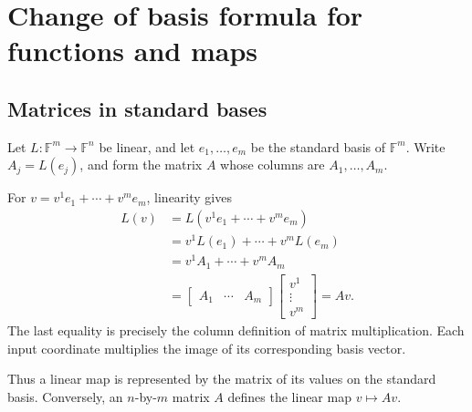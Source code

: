 \section{Change of basis formula for functions and maps}
\label{sec:linear-algebra-i:change-of-basis-for-functions-and-maps}

\subsection{Matrices in standard bases}

Let \(L:\mathbb F^m\to\mathbb F^n\) be linear, and let
\(e_1,\ldots,e_m\) be the standard basis of \(\mathbb F^m\).
Write \(A_j=L(e_j)\), and form the matrix \(A\) whose columns are
\(A_1,\ldots,A_m\).
\begin{pendingreview}
For \(v=v^1e_1+\cdots+v^me_m\), linearity gives
\[
  \begin{aligned}
    L(v)&=L(v^1e_1+\cdots+v^me_m)\\
      &=v^1L(e_1)+\cdots+v^mL(e_m)\\
      &=v^1A_1+\cdots+v^mA_m\\
      &=\begin{bmatrix}A_1&\cdots&A_m\end{bmatrix}
        \begin{bmatrix}v^1\\\vdots\\v^m\end{bmatrix}=Av.
  \end{aligned}
\]
The last equality is precisely the column definition of matrix multiplication.
Each input coordinate multiplies the image of its corresponding basis vector.
\end{pendingreview}
Thus a linear map is represented by the matrix of its values on the
standard basis. Conversely, an \(n\)-by-\(m\) matrix \(A\) defines the
linear map \(v\mapsto Av\).

